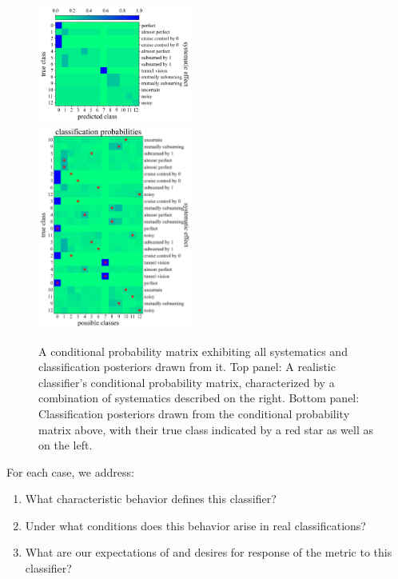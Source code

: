 \begin{figure}
	\begin{center}
		\includegraphics[width=0.45\textwidth]{./fig/combined.png}\\
    \includegraphics[width=0.45\textwidth]{./fig/examples.png}
		\caption{A conditional probability matrix exhibiting all systematics and classification posteriors drawn from it.
		Top panel: A realistic classifier's conditional probability matrix, characterized by a combination of systematics described on the right.
		Bottom panel: Classification posteriors drawn from the conditional probability matrix above, with their true class indicated by a red star as well as on the left.
		}
		\label{fig:mock_probs}
	\end{center}
\end{figure}

For each case, we address:
\begin{enumerate}
  \item What characteristic behavior defines this classifier?
  \item Under what conditions does this behavior arise in real classifications?
  \item What are our expectations of and desires for response of the metric to this classifier?
\end{enumerate}


